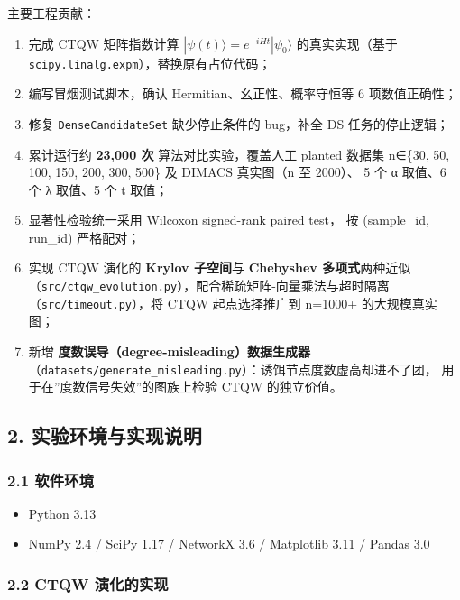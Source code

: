 \documentclass[
  11pt,
]{ctexart}
\providecommand{\tightlist}{%
  \setlength{\itemsep}{0pt}\setlength{\parskip}{0pt}}
\begin{document}
主要工程贡献：

\begin{enumerate}
\def\labelenumi{\arabic{enumi}.}
\tightlist
\item
  完成 CTQW 矩阵指数计算 \(|\psi(t)\rangle = e^{-iHt}|\psi_0\rangle\)
  的真实实现（基于 \texttt{scipy.linalg.expm}），替换原有占位代码；
\item
  编写冒烟测试脚本，确认 Hermitian、幺正性、概率守恒等 6 项数值正确性；
\item
  修复 \texttt{DenseCandidateSet} 缺少停止条件的 bug，补全 DS
  任务的停止逻辑；
\item
  累计运行约 \textbf{23,000 次} 算法对比实验，覆盖人工 planted 数据集
  n∈\{30, 50, 100, 150, 200, 300, 500\} 及 DIMACS 真实图（n 至 2000）、
  5 个 α 取值、6 个 λ 取值、5 个 t 取值；
\item
  显著性检验统一采用 Wilcoxon signed-rank paired test， 按 (sample\_id,
  run\_id) 严格配对；
\item
  实现 CTQW 演化的 \textbf{Krylov 子空间}与 \textbf{Chebyshev
  多项式}两种近似
  （\texttt{src/ctqw\_evolution.py}），配合稀疏矩阵-向量乘法与超时隔离
  （\texttt{src/timeout.py}），将 CTQW 起点选择推广到 n=1000+
  的大规模真实图；
\item
  新增 \textbf{度数误导（degree-misleading）数据生成器}
  （\texttt{datasets/generate\_misleading.py}）：诱饵节点度数虚高却进不了团，
  用于在''度数信号失效''的图族上检验 CTQW 的独立价值。
\end{enumerate}

\subsection{2.
实验环境与实现说明}\label{ux5b9eux9a8cux73afux5883ux4e0eux5b9eux73b0ux8bf4ux660e}

\subsubsection{2.1 软件环境}\label{ux8f6fux4ef6ux73afux5883}

\begin{itemize}
\tightlist
\item
  Python 3.13
\item
  NumPy 2.4 / SciPy 1.17 / NetworkX 3.6 / Matplotlib 3.11 / Pandas 3.0
\end{itemize}

\subsubsection{2.2 CTQW
演化的实现}\label{ctqw-ux6f14ux5316ux7684ux5b9eux73b0}
\end{document}
